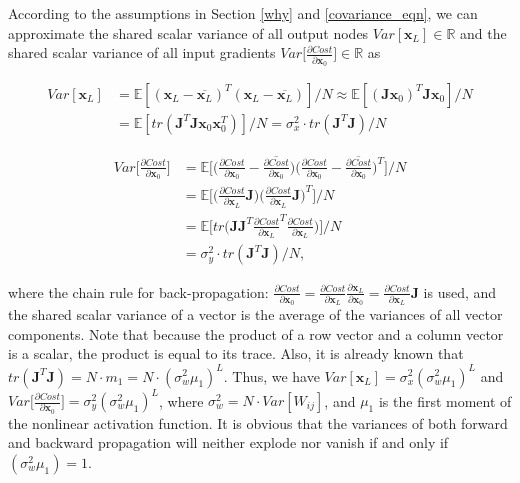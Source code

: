 According to the assumptions in Section \ref{why} and  \eqref{covariance_eqn}, we can approximate the shared scalar variance of all output nodes $Var[\mathbf{x}_L]\in\mathbb{R}$ and the shared scalar variance of all input gradients $Var\Big[\frac{\partial Cost}{\partial \mathbf{x}_0}\Big]\in\mathbb{R}$ as

\begin{equation}
    \begin{aligned}
    Var[\mathbf{x}_L] &=\mathbb{E}[(\mathbf{x}_L-\overline{\mathbf{x}_L})^T(\mathbf{x}_L-\overline{\mathbf{x}_L})]/N
    \approx \mathbb{E}[(\mathbf{Jx}_0)^T\mathbf{Jx}_0]/N\\
    &=\mathbb{E}[tr(\mathbf{J}^T\mathbf{J}\mathbf{x}_0\mathbf{x}_0^T)]/N
    =\sigma_x^2\cdot tr(\mathbf{J}^T\mathbf{J})/N
    \label{xvar_to_trace}
    \end{aligned}
\end{equation}

\begin{equation}
    \begin{aligned}
    Var\Big[\frac{\partial Cost}{\partial \mathbf{x}_0}\Big]
    &=\mathbb{E}\Big[\Big(\frac{\partial Cost}{\partial \mathbf{x}_0}-\overline{\frac{\partial Cost}{\partial \mathbf{x}_0}}\Big)
    \Big(\frac{\partial Cost}{\partial \mathbf{x}_0}-\overline{\frac{\partial Cost}{\partial \mathbf{x}_0}}\Big)^T\Big]\Big/N
    \\
    &= \mathbb{E}\Big[
    \Big(\frac{\partial Cost}{\partial \mathbf{x}_L}\mathbf{J}\Big)
    \Big(\frac{\partial Cost}{\partial \mathbf{x}_L}\mathbf{J}\Big)^T\Big]\Big/N
    \\
    &=\mathbb{E}\Big[tr\Big(\mathbf{J}\mathbf{J}^T\frac{\partial Cost}{\partial \mathbf{x}_L}^T\frac{\partial Cost}{\partial \mathbf{x}_L}\Big)\Big]/N
    \\
    &=\sigma_y^2\cdot tr(\mathbf{J}^T\mathbf{J})/N,
    \end{aligned}
    \label{yvar_to_trace}
\end{equation}

where the chain rule for back-propagation: $\frac{\partial Cost}{\partial \mathbf{x}_0}=\frac{\partial Cost}{\partial \mathbf{x}_L}\frac{\partial \mathbf{x}_L}{\partial \mathbf{x}_0}=\frac{\partial Cost}{\partial \mathbf{x}_L}\mathbf{J}$ is used, and the shared scalar variance of a vector is the average of the variances of all vector components.
Note that because the product of a row vector and a column vector is a scalar, the product is equal to its trace. Also, it is already known that
$tr(\mathbf{J}^T\mathbf{J})=N\cdot m_1=N\cdot(\sigma_w^2\mu_1)^L$. Thus, we have $Var[\mathbf{x}_L]=\sigma_x^2(\sigma_w^2\mu_1)^L$ and $Var\Big[\frac{\partial Cost}{\partial \mathbf{x}_0}\Big]=\sigma_y^2(\sigma_w^2\mu_1)^L$,
where $\sigma_w^2=N\cdot Var[W_{ij}]$, and $\mu_1$ is the first moment of the nonlinear activation function. It is obvious that the variances of both forward and backward propagation will neither explode nor vanish if and only if $(\sigma_w^2\mu_1)=1$.


